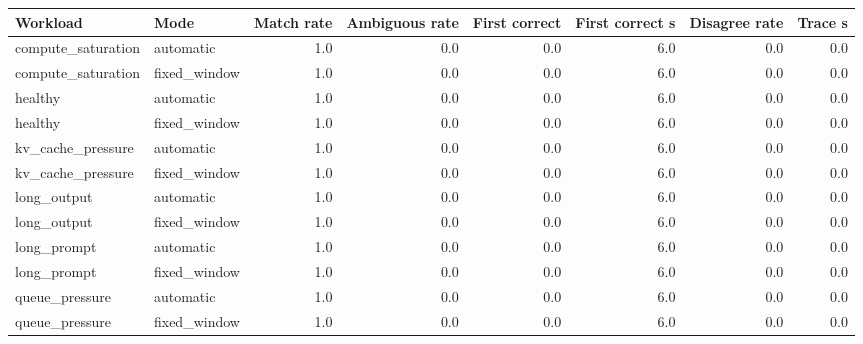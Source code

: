 \begin{tabular}{llrrrrrr}
\hline
Workload & Mode & Match rate & Ambiguous rate & First correct & First correct s & Disagree rate & Trace s \\
\hline
compute_saturation & automatic & 1.0 & 0.0 & 0.0 & 6.0 & 0.0 & 0.0 \\
compute_saturation & fixed_window & 1.0 & 0.0 & 0.0 & 6.0 & 0.0 & 0.0 \\
healthy & automatic & 1.0 & 0.0 & 0.0 & 6.0 & 0.0 & 0.0 \\
healthy & fixed_window & 1.0 & 0.0 & 0.0 & 6.0 & 0.0 & 0.0 \\
kv_cache_pressure & automatic & 1.0 & 0.0 & 0.0 & 6.0 & 0.0 & 0.0 \\
kv_cache_pressure & fixed_window & 1.0 & 0.0 & 0.0 & 6.0 & 0.0 & 0.0 \\
long_output & automatic & 1.0 & 0.0 & 0.0 & 6.0 & 0.0 & 0.0 \\
long_output & fixed_window & 1.0 & 0.0 & 0.0 & 6.0 & 0.0 & 0.0 \\
long_prompt & automatic & 1.0 & 0.0 & 0.0 & 6.0 & 0.0 & 0.0 \\
long_prompt & fixed_window & 1.0 & 0.0 & 0.0 & 6.0 & 0.0 & 0.0 \\
queue_pressure & automatic & 1.0 & 0.0 & 0.0 & 6.0 & 0.0 & 0.0 \\
queue_pressure & fixed_window & 1.0 & 0.0 & 0.0 & 6.0 & 0.0 & 0.0 \\
\hline
\end{tabular}
